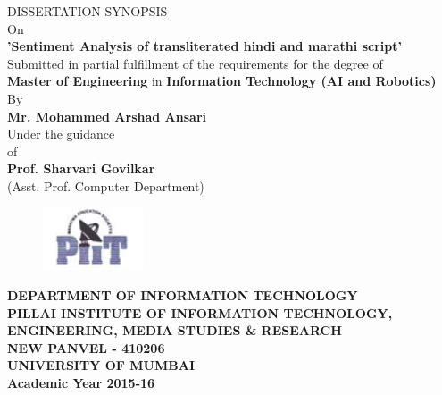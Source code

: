 \documentclass[12pt]{article}
\begin{document}
\thispagestyle{empty}

\begin{center}
  	\fontsize{16}{30}\selectfont DISSERTATION SYNOPSIS\\On\\
  	\fontsize{20}{30}\selectfont \textbf{'Sentiment Analysis of transliterated
        hindi and marathi script'}\\
  	\fontsize{14}{24}\selectfont Submitted in partial fulfillment of the
    requirements for the degree of\\
  	\fontsize{16}{30}\selectfont \textbf{Master of Engineering} in \textbf{Information Technology (AI and Robotics)} \\
  	\fontsize{16}{30}\selectfont By\\
  	\fontsize{16}{30}\selectfont \textbf{Mr. Mohammed Arshad Ansari}\\
    \fontsize{16}{30}\selectfont Under the guidance\\of\\\textbf{Prof. Sharvari Govilkar}\\(Asst. Prof. Computer Department)\\
	\vspace{30mm}
	\begin{figure}[ht!]
	  \centering
	  \includegraphics[width=30mm]{piit.png}
	\end{figure}
  	\fontsize{14}{20}\selectfont \textbf{DEPARTMENT OF INFORMATION TECHNOLOGY\\PILLAI INSTITUTE OF INFORMATION TECHNOLOGY,\\
	ENGINEERING, MEDIA STUDIES \& RESEARCH\\ NEW PANVEL - 410206\\UNIVERSITY OF
    MUMBAI\\Academic Year 2015-16}

\end{center}
\end{document}
